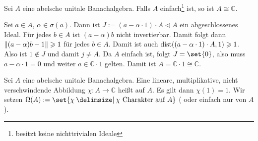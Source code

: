 \begin{proposition}[label=prop1.11_einfach,{name=[Einfache abelsche unitale Banachalgebra]}]
	Sei $A$ eine abelsche unitale Banachalgebra. Falls $A$ einfach\footnote{besitzt keine nichttrivialen Ideale} ist, so ist $A \cong \mathbb{C}$. 
\end{proposition}
\begin{beweis}
	Sei $a \in A$, $\alpha \in \sigma(a)$. Dann ist $J := \overline{(a-\alpha \cdot 1)\cdot A} \lhd A$ ein abgeschlossenes Ideal. Für jedes $b \in A$ ist $(a-\alpha)b$ nicht 
	invertierbar. Damit folgt dann $\norm{(a-\alpha)b - 1}\ge 1$ für jedes $b \in A$. Damit ist auch $\dist\enbrace*{(a-\alpha \cdot 1)\cdot A,1}\ge 1$. Also ist $1 \notin J$ und 
	damit $j \not= A$. Da $A$ einfach ist, folgt $J=\set{0}$, also muss $a-\alpha \cdot 1=0$ und weiter $a \in \mathbb{C} \cdot 1$ gelten. Damit ist 
	$A = \mathbb{C} \cdot 1 \cong \mathbb{C}$.
\end{beweis}

\begin{definition}[{name=[Charakter]}]
	Sei $A$ eine abelsche unitale Banachalgebra. Eine lineare, multiplikative, nicht verschwindende Abbildung $\chi \colon A \to \mathbb{C}$ heißt  auf $A$.  
	Es gilt dann $\chi(1)=1$. Wir setzen $\Omega(A) := \set{\chi \given \chi \text{ Charakter auf }A}$ ( oder einfach nur  von $A$).
\end{definition}

